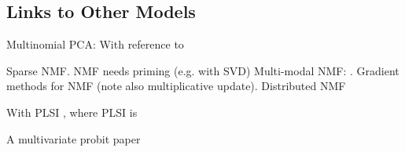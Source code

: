 

\subsection{Links to Other Models}

Multinomial PCA: \cite{Buntine2002} With reference to \cite{Rubin2011}

Sparse NMF\cite{Hoyer2004}. NMF needs priming (e.g. with SVD) \cite{Boutsidis2008}
Multi-modal NMF: \cite{Bouchard2012}. Gradient methods for NMF (note also multiplicative update)\cite{Lin2007}. Distributed NMF\cite{Liu2010}

With PLSI \cite{GiKa2003}, where PLSI is\cite{Hofmann1999}

A multivariate probit paper \cite{Talhouk2011}


